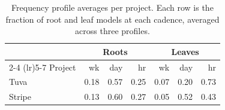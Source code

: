 
\begin{table}[tb]
\centering
\caption{Frequency profile averages per project. Each row is the fraction of root and leaf models at each cadence, averaged across three profiles.}
\label{dag:tab:freq-profiles}
\small
\begin{tabular}{lrrrrrr}
\toprule
& \multicolumn{3}{c}{Roots} & \multicolumn{3}{c}{Leaves} \\
\cmidrule(lr){2-4} \cmidrule(lr){5-7}
Project & wk & day & hr & wk & day & hr \\
\midrule
Tuva   & 0.18 & 0.57 & 0.25 & 0.07 & 0.20 & 0.73 \\
Stripe & 0.13 & 0.60 & 0.27 & 0.05 & 0.52 & 0.43 \\
\bottomrule
\end{tabular}
\end{table}

